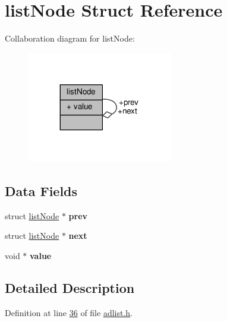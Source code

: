 \hypertarget{structlistNode}{}\section{list\+Node Struct Reference}
\label{structlistNode}


Collaboration diagram for list\+Node\+:\nopagebreak
\begin{figure}[H]
\begin{center}
\leavevmode
\includegraphics[width=179pt]{structlistNode__coll__graph}
\end{center}
\end{figure}
\subsection*{Data Fields}
\begin{DoxyCompactItemize}
\item 
\mbox{\label{structlistNode_a79259218e5b958028b7e650d48d3cb01}} 
struct \hyperlink{structlistNode}{list\+Node} $\ast$ {\bfseries prev}
\item 
\mbox{\label{structlistNode_a860785ea27fb1c044d6a59ba491dd6ab}} 
struct \hyperlink{structlistNode}{list\+Node} $\ast$ {\bfseries next}
\item 
\mbox{\label{structlistNode_a772dfdd1352f9a568bb567d65cb7b92a}} 
void $\ast$ {\bfseries value}
\end{DoxyCompactItemize}


\subsection{Detailed Description}


Definition at line \hyperlink{adlist_8h_source_l00036}{36} of file \hyperlink{adlist_8h_source}{adlist.\+h}.



